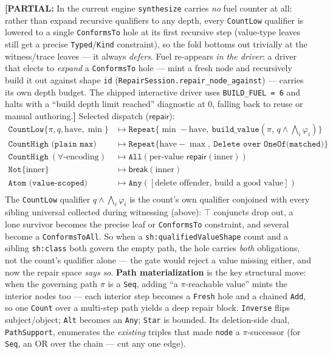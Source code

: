 \documentclass[11pt]{article}
\newcommand{\Repair}{\mathsf{repair}}
\newcommand{\Break}{\mathsf{break}}
\newcommand{\code}[1]{\texttt{#1}}
\theoremstyle{definition}
\newcommand{\PART}[1]{{\color{nired}\textbf{[PARTIAL:} #1\textbf{]}}}
\begin{document}
\PART{In the current engine \code{synthesize} carries \emph{no} fuel counter at
all: rather than expand recursive qualifiers to any depth, every \code{CountLow}
qualifier is lowered to a single \code{ConformsTo} hole at its first recursive step
(value-type leaves still get a precise \code{Typed}/\code{Kind} constraint), so the
fold bottoms out trivially at the witness/trace leaves --- it always
\emph{defers}. Fuel re-appears \emph{in the driver}: a driver that elects to
\emph{expand} a \code{ConformsTo} hole --- mint a fresh node and recursively build
it out against shape \code{id} (\code{RepairSession.repair\_node\_against}) ---
carries its own depth budget. The shipped interactive driver uses
\code{BUILD\_FUEL = 6} and halts with a ``build depth limit reached'' diagnostic at
$0$, falling back to reuse or manual authoring.}
Selected dispatch ($\Repair$):
\[
\begin{array}{ll}
\code{CountLow}\{\pi,q,\mathrm{have},\min\} & \mapsto \code{Repeat}\{\min{-}\mathrm{have},\ \code{build\_value}(\pi,\,q\wedge\textstyle\bigwedge_i\varphi_i)\}\\
\code{CountHigh (plain max)} & \mapsto \code{Repeat}\{\mathrm{have}{-}\max,\ \code{Delete over OneOf(matched)}\}\\
\code{CountHigh}\ (\forall\text{-encoding}) & \mapsto \code{All}(\text{per-value } \Repair(\text{inner}))\\
\code{Not}\{\text{inner}\} & \mapsto \Break(\text{inner})\\
\code{Atom (value-scoped)} & \mapsto \code{Any}([\text{delete offender, build a good value}])\\
\end{array}
\]
The \code{CountLow} qualifier $q\wedge\bigwedge_i\varphi_i$ is the count's own
qualifier conjoined with every sibling universal collected during witnessing
(above): $\top$ conjuncts drop out, a lone survivor becomes the precise leaf or
\code{ConformsTo} constraint, and several become a \code{ConformsToAll}. So when a
\code{sh:qualifiedValueShape} count and a sibling \code{sh:class} both govern the
empty path, the hole carries \emph{both} obligations, not the count's qualifier
alone --- the gate would reject a value missing either, and now the repair space
\emph{says so}.
\textbf{Path materialization} is the key structural move: when the governing path
$\pi$ is a \code{Seq}, adding ``a $\pi$-reachable value'' mints the interior nodes
too --- each interior step becomes a \code{Fresh} hole and a chained \code{Add},
so one \code{Count} over a multi-step path yields a deep repair block.
\code{Inverse} flips subject/object; \code{Alt} becomes an \code{Any};
\code{Star} is bounded. Its deletion-side dual, \code{PathSupport}, enumerates the
\emph{existing} triples that made \code{node} a $\pi$-successor (for \code{Seq}, an
OR over the chain --- cut any one edge).
\end{document}
